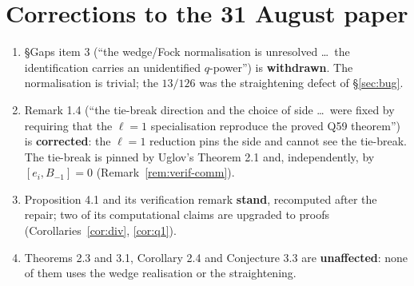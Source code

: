 \documentclass[11pt]{article}
\theoremstyle{definition}
\theoremstyle{remark}
\begin{document}
\section{Corrections to the 31 August paper}\label{sec:corrections}

\begin{enumerate}
\item \S Gaps item 3 (``the wedge/Fock normalisation is unresolved \dots\ the
identification carries an unidentified $q$-power'') is \textbf{withdrawn}. The
normalisation is trivial; the $13/126$ was the straightening defect of \S\ref{sec:bug}.
\item Remark 1.4 (``the tie-break direction and the choice of side \dots\ were fixed by
requiring that the $\ell=1$ specialisation reproduce the proved Q59 theorem'') is
\textbf{corrected}: the $\ell=1$ reduction pins the side and cannot see the tie-break.
The tie-break is pinned by Uglov's Theorem 2.1 and, independently, by
$[e_i,B_{-1}]=0$ (Remark~\ref{rem:verif-comm}).
\item Proposition 4.1 and its verification remark \textbf{stand}, recomputed after the
repair; two of its computational claims are upgraded to proofs
(Corollaries~\ref{cor:div}, \ref{cor:q1}).
\item Theorems 2.3 and 3.1, Corollary 2.4 and Conjecture 3.3 are \textbf{unaffected}:
none of them uses the wedge realisation or the straightening.
\end{enumerate}
\end{document}

